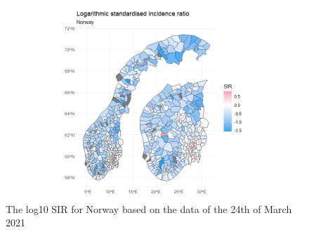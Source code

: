 %   
\begin{figure}[H]
  \centering
  \includegraphics[width = 1.2\textwidth]{sir_norway_log.png}
  \caption{The log10 SIR for Norway based on the data of the 24th of March 2021}
  \label{sirnorwaylog}
\end{figure}
\clearpage
